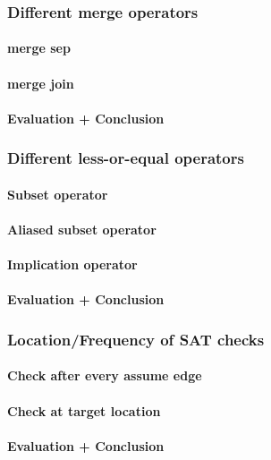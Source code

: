 \documentclass[a4paper,11pt]{article}
\begin{document}
\subsubsection{Different merge operators}
\paragraph{merge sep}
\paragraph{merge join}
\paragraph{Evaluation + Conclusion}
\subsubsection{Different less-or-equal operators}
\paragraph{Subset operator}
\paragraph{Aliased subset operator}
\paragraph{Implication operator}
\paragraph{Evaluation + Conclusion}
\subsubsection{Location/Frequency of SAT checks}
\paragraph{Check after every assume edge}
\paragraph{Check at target location}
\paragraph{Evaluation + Conclusion}

\end{document}

